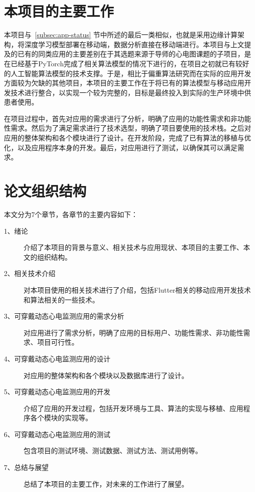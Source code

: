 \section{本项目的主要工作}\label{sec:work}

本项目与~\ref{subsec:app-status} 节中所述的最后一类相似，也就是采用边缘计算架构，将深度学习模型部署在移动端，数据分析直接在移动端进行。本项目与上文提及的已有的同类应用的主要差别在于其选题来源于导师的心电图课题的子项目，是在已经基于PyTorch完成了相关算法模型\cite{songDongtaixindiantudezhinengjiancesuanfayanjiuyuyingyong2022}的情况下进行的，在项目之初就已有较好的人工智能算法模型的技术支撑。于是，相比于偏重算法研究而在实际的应用开发方面较为欠缺的其他项目，本项目的主要工作在于将已有的算法模型与移动应用开发技术进行整合，以实现一个较为完整的\app ，目标是最终投入到实际的生产环境中供患者使用。

在项目过程中，首先对应用的需求进行了分析，明确了应用的功能性需求和非功能性需求。然后为了满足需求进行了技术选型，明确了项目要使用的技术栈。之后对应用的整体架构和各个模块进行了设计。在开发阶段，完成了已有算法的移植与优化，以及应用程序本身的开发。最后，对应用进行了测试，以确保其可以满足需求。


\section{论文组织结构}\label{sec:structure}

本文分为7个章节，各章节的主要内容如下：

\begin{description}
    \item [1、绪论] 介绍了本项目的背景与意义、相关技术与应用现状、本项目的主要工作、本文的组织结构。
    \item [2、相关技术介绍] 对本项目使用的相关技术进行了介绍，包括Flutter相关的移动应用开发技术和算法相关的一些技术。
    \item [3、可穿戴动态心电监测应用的需求分析] 对应用进行了需求分析，明确了应用的目标用户、功能性需求、非功能性需求、项目可行性。
    \item [4、可穿戴动态心电监测应用的设计] 对应用的整体架构和各个模块以及数据库进行了设计。
    \item [5、可穿戴动态心电监测应用的开发] 介绍了应用的开发过程，包括开发环境与工具、算法的实现与移植、应用程序各个模块的实现等。
    \item [6、可穿戴动态心电监测应用的测试] 包含项目的测试环境、测试数据、测试方法、测试用例等。
    \item [7、总结与展望] 总结了本项目的主要工作，对未来的工作进行了展望。
\end{description}
